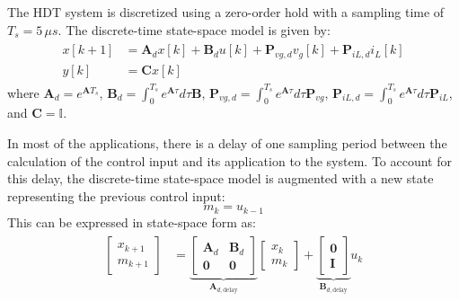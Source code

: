 The HDT system is discretized using a zero-order hold with a sampling time of $T_s = 5\,\mu s$. The discrete-time state-space model is given by:
\begin{align}
    \begin{aligned}
        x[k+1] &= \mathbf{A}_d x[k] + \mathbf{B}_d u[k] + \mathbf{P}_{vg,d} v_g[k] + \mathbf{P}_{iL,d} i_L[k]\\
        y[k] &= \mathbf{C} x[k]
    \end{aligned}
\end{align}
where $\mathbf{A}_d = e^{\mathbf{A}T_s}$, $\mathbf{B}_d = \int_0^{T_s} e^{\mathbf{A}\tau} d\tau \mathbf{B}$, $\mathbf{P}_{vg,d} = \int_0^{T_s} e^{\mathbf{A}\tau} d\tau \mathbf{P}_{vg}$, $\mathbf{P}_{iL,d} = \int_0^{T_s} e^{\mathbf{A}\tau} d\tau \mathbf{P}_{iL}$, and $\mathbf{C} = \mathbb{I}$.

In most of the applications, there is a delay of one sampling period between the calculation of the control input and its application to the system. To account for this delay, the discrete-time state-space model is augmented with a new state representing the previous control input:
\begin{equation}
    m_k = u_{k - 1}
\end{equation}
This can be expressed in state-space form as:
\begin{align}
    \begin{aligned}
        \begin{bmatrix}
            x_{k + 1}\\
            m_{k + 1}
        \end{bmatrix}
        &=
        \underbrace{
        \begin{bmatrix}
            \mathbf{A}_d & \mathbf{B}_d \\
            \mathbf{0} & \mathbf{0}
        \end{bmatrix}
        }_{\mathbf{A}_{d,\text{delay}}}
        \begin{bmatrix}
            x_k\\
            m_k
        \end{bmatrix}
        +
        \underbrace{
        \begin{bmatrix}
            \mathbf{0}\\
            \mathbf{I}
        \end{bmatrix}
        }_{\mathbf{B}_{d,\text{delay}}}
        u_k
    \end{aligned}
\end{align}